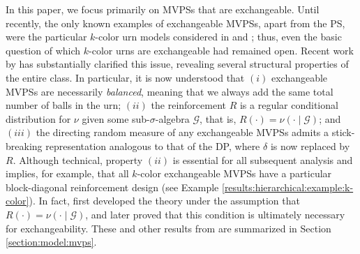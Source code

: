 \documentclass[a4paper]{article}
\theoremstyle{plain}
\theoremstyle{remark}
\theoremstyle{definition}
\begin{document}
In this paper, we focus primarily on MVPSs that are exchangeable. Until recently, the only known examples of exchangeable MVPSs, apart from the PS, were the particular $k$-color urn models considered in \citet[p.\,1591]{hill1987} and \citet[Section 2]{dakkak2014}; thus, even the basic question of which $k$-color urns are exchangeable had remained open. Recent work by \cite{berti2023kernel,sariev2024,sariev2023sufficientness} has substantially clarified this issue, revealing several structural properties of the entire class. In particular, it is now understood that $(i)$ exchangeable MVPSs are necessarily \textit{balanced}, meaning that we always add the same total number of balls in the urn; $(ii)$ the reinforcement $R$ is a regular conditional distribution for $\nu$ given some sub-$\sigma$-algebra $\mathcal{G}$, that is, $R(\cdot)=\nu(\cdot\mid\mathcal{G})$; and $(iii)$ the directing random measure of any exchangeable MVPSs admits a stick-breaking representation analogous to that of the DP, where $\delta$ is now replaced by $R$. Although technical, property $(ii)$ is essential for all subsequent analysis and implies, for example, that all $k$-color exchangeable MVPSs have a particular block-diagonal reinforcement design (see Example \ref{results:hierarchical:example:k-color}). In fact, \cite{berti2023kernel} first developed the theory under the assumption that $R(\cdot)=\nu(\cdot\mid\mathcal{G})$, and later \cite{sariev2024} proved that this condition is ultimately necessary for exchangeability. These and other results from \cite{berti2023kernel,sariev2024,sariev2023sufficientness} are summarized in Section \ref{section:model:mvps}.
\end{document}
